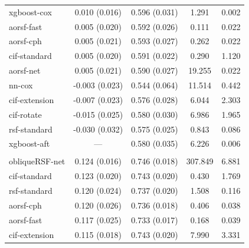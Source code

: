\documentclass[twoside,11pt]{article}\usepackage[]{graphicx}\usepackage[]{xcolor}
\newenvironment{knitrout}{}{} %
\begin{document}
\begin{knitrout}
\begin{longtable}[t]{lcccc}
\hspace{1em}xgboost-cox & 0.010 (0.016) & 0.596 (0.031) & 1.291 & 0.002\\
\hspace{1em}aorsf-fast & 0.005 (0.020) & 0.592 (0.026) & 0.111 & 0.022\\
\hspace{1em}aorsf-cph & 0.005 (0.021) & 0.593 (0.027) & 0.262 & 0.022\\
\hspace{1em}cif-standard & 0.005 (0.020) & 0.591 (0.022) & 0.290 & 1.120\\
\hspace{1em}aorsf-net & 0.005 (0.021) & 0.590 (0.027) & 19.255 & 0.022\\
\hspace{1em}nn-cox & -0.003 (0.023) & 0.544 (0.064) & 11.514 & 0.442\\
\hspace{1em}cif-extension & -0.007 (0.023) & 0.576 (0.028) & 6.044 & 2.303\\
\hspace{1em}cif-rotate & -0.015 (0.025) & 0.580 (0.030) & 6.986 & 1.965\\
\hspace{1em}rsf-standard & -0.030 (0.032) & 0.575 (0.025) & 0.843 & 0.086\\
\hspace{1em}xgboost-aft & --- & 0.580 (0.035) & 6.226 & 0.006\\
\addlinespace[0.3em]
\multicolumn{5}{l}{\textit{\textbf{GBSG II; recurrence or death, n = 686, p = 10}}}\\
\hline
\hspace{1em}obliqueRSF-net & 0.124 (0.016) & 0.746 (0.018) & 307.849 & 6.881\\
\hspace{1em}cif-standard & 0.123 (0.020) & 0.743 (0.020) & 0.430 & 1.769\\
\hspace{1em}rsf-standard & 0.120 (0.024) & 0.737 (0.020) & 1.508 & 0.116\\
\hspace{1em}aorsf-cph & 0.120 (0.026) & 0.736 (0.018) & 0.406 & 0.038\\
\hspace{1em}aorsf-fast & 0.117 (0.025) & 0.733 (0.017) & 0.168 & 0.039\\
\hspace{1em}cif-extension & 0.115 (0.018) & 0.743 (0.020) & 7.990 & 3.331\\

\end{longtable}
\end{knitrout}
\end{document}
